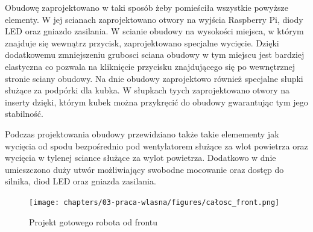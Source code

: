 Obudowę zaprojektowano w taki sposób żeby pomieściła wszystkie powyższe elementy. W jej scianach zaprojektowano otwory na wyjścia Raspberry Pi, 
diody LED oraz gniazdo zasilania. W scianie obudowy na wysokości miejsca, w którym znajduje się wewnątrz przycisk, zaprojektowano specjalne wycięcie.
Dzięki dodatkowemu zmniejszeniu grubosci sciana obudowy w tym miejscu jest bardziej elastyczna co pozwala na kliknięcie przycisku znajdującego
się po wewnętrznej stronie sciany obudowy. Na dnie obudowy zaprojektowo również specjalne słupki służące za podpórki dla kubka. 
W słupkach tyych zaprojektowano otwory na inserty dzięki, którym kubek można przykręcić do obudowy gwarantując tym jego stabilność.

Podczas projektowania obudowy przewidziano także takie elemementy jak wycięcia od spodu bezpośrednio pod wentylatorem służące za wlot powietrza 
oraz wycięcia w tylenej sciance służące za wylot powietrza. Dodatkowo w dnie umieszczono duży utwór możliwiający swobodne mocowanie oraz dostęp do 
silnika, diod LED oraz gniazda zasilania.

\begin{figure}[H]
    \centering
    \texttt{[image: chapters/03-praca-wlasna/figures/całosc\_front.png]}
    \caption{\label{fig:gotowy}Projekt gotowego robota od frontu}
\end{figure}